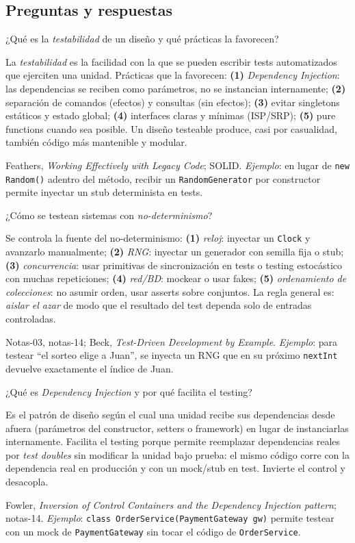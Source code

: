 \documentclass[11pt,a4paper]{article}
\newcounter{preg}
\newcommand{\qa}[3]{%
  \stepcounter{preg}%
  \vspace{0.4em}
  \begin{preguntabox}{\thepreg}
  #1
  \end{preguntabox}
  \begin{respuestabox}
  #2
  \end{respuestabox}
  \begin{refbox}
  #3
  \end{refbox}
  \vspace{0.6em}
}
\begin{document}
\subsection*{Preguntas y respuestas}

\qa{¿Qué es la \emph{testabilidad} de un diseño y qué prácticas la favorecen?}
{La \emph{testabilidad} es la facilidad con la que se pueden escribir tests automatizados que ejerciten una unidad. Prácticas que la favorecen: \textbf{(1)} \emph{Dependency Injection}: las dependencias se reciben como parámetros, no se instancian internamente; \textbf{(2)} separación de comandos (efectos) y consultas (sin efectos); \textbf{(3)} evitar singletons estáticos y estado global; \textbf{(4)} interfaces claras y mínimas (ISP/SRP); \textbf{(5)} pure functions cuando sea posible. Un diseño testeable produce, casi por casualidad, también código más mantenible y modular.}
{Feathers, \emph{Working Effectively with Legacy Code}; SOLID. \emph{Ejemplo}: en lugar de \texttt{new Random()} adentro del método, recibir un \texttt{RandomGenerator} por constructor permite inyectar un stub determinista en tests.}

\qa{¿Cómo se testean sistemas con \emph{no-determinismo}?}
{Se controla la fuente del no-determinismo: \textbf{(1)} \emph{reloj}: inyectar un \texttt{Clock} y avanzarlo manualmente; \textbf{(2)} \emph{RNG}: inyectar un generador con semilla fija o stub; \textbf{(3)} \emph{concurrencia}: usar primitivas de sincronización en tests o testing estocástico con muchas repeticiones; \textbf{(4)} \emph{red/BD}: mockear o usar fakes; \textbf{(5)} \emph{ordenamiento de colecciones}: no asumir orden, usar asserts sobre conjuntos. La regla general es: \emph{aislar el azar} de modo que el resultado del test dependa solo de entradas controladas.}
{Notas-03, notas-14; Beck, \emph{Test-Driven Development by Example}. \emph{Ejemplo}: para testear ``el sorteo elige a Juan'', se inyecta un RNG que en su próximo \texttt{nextInt} devuelve exactamente el índice de Juan.}

\qa{¿Qué es \emph{Dependency Injection} y por qué facilita el testing?}
{Es el patrón de diseño según el cual una unidad recibe sus dependencias desde afuera (parámetros del constructor, setters o framework) en lugar de instanciarlas internamente. Facilita el testing porque permite reemplazar dependencias reales por \emph{test doubles} sin modificar la unidad bajo prueba: el mismo código corre con la dependencia real en producción y con un mock/stub en test. Invierte el control y desacopla.}
{Fowler, \emph{Inversion of Control Containers and the Dependency Injection pattern}; notas-14. \emph{Ejemplo}: \texttt{class OrderService(PaymentGateway gw)} permite testear con un mock de \texttt{PaymentGateway} sin tocar el código de \texttt{OrderService}.}
\end{document}
